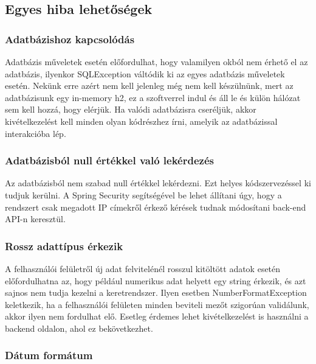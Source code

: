 \subsection{Egyes hiba lehetőségek}

\subsubsection{Adatbázishoz kapcsolódás}
Adatbázis műveletek esetén előfordulhat, hogy valamilyen okból nem érhető el az adatbázis, ilyenkor SQLException váltódik ki az egyes adatbázis műveletek esetén. Nekünk erre azért nem kell jelenleg még nem kell készülnünk, mert az adatbázisunk egy in-memory h2, ez a szoftverrel indul és áll le és külön hálózat sem kell hozzá, hogy elérjük. Ha valódi adatbázisra cseréljük, akkor kivételkezelést kell minden olyan kódrészhez írni, amelyik az adatbázissal interakcióba lép.

\subsubsection{Adatbázisból null értékkel való lekérdezés}
Az adatbázisból nem szabad null értékkel lekérdezni. Ezt helyes kódszervezéssel ki tudjuk kerülni. A Spring Security segítségével be lehet állítani úgy, hogy a rendszert csak megadott IP címekről érkező kérések tudnak módosítani back-end API-n keresztül.

\subsubsection{Rossz adattípus érkezik}
A felhasználói felületről új adat felvitelénél rosszul kitöltött adatok esetén előfordulhatna az, hogy például numerikus adat helyett egy string érkezik, és azt sajnos nem tudja kezelni a keretrendszer. Ilyen esetben NumberFormatException keletkezik, ha a felhasználói felületen minden beviteli mezőt szigorúan validálunk, akkor ilyen nem fordulhat elő. Esetleg érdemes lehet kivételkezelést is használni a backend oldalon, ahol ez bekövetkezhet. 

\subsubsection{Dátum formátum}